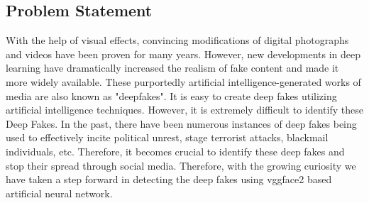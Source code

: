 \subsection{Problem Statement}
With the help of visual effects, convincing modifications of digital photographs and videos have been proven for many years. However, new developments in deep learning have dramatically increased the realism of fake content and made it more widely available.   These purportedly artificial intelligence-generated works of media are also known as "deepfakes". It is easy to create deep fakes utilizing artificial intelligence techniques. However, it is extremely difficult to identify these Deep Fakes. In the past, there have been numerous instances of deep fakes being used to effectively incite political unrest, stage terrorist attacks, blackmail individuals, etc. Therefore, it becomes crucial to identify these deep fakes and stop their spread through social media. Therefore, with the growing curiosity we have taken a
step forward in detecting the deep fakes using vggface2 based artificial neural network.